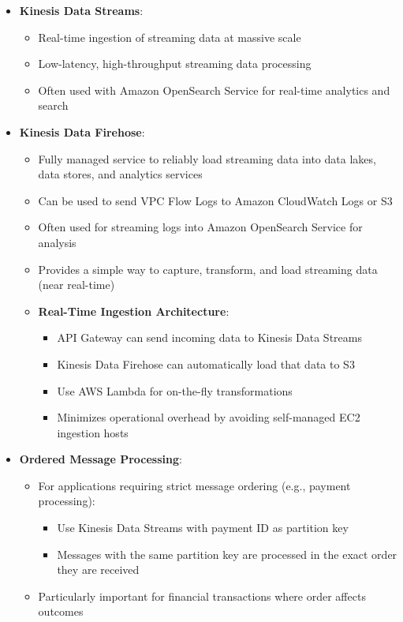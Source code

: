 \documentclass[11pt,a4paper]{report}
\begin{document}
\begin{itemize}
  \item \textbf{Kinesis Data Streams}:
\begin{itemize}
  \item Real-time ingestion of streaming data at massive scale
  \item Low-latency, high-throughput streaming data processing
  \item Often used with Amazon OpenSearch Service for real-time analytics and search
\end{itemize}
  \item \textbf{Kinesis Data Firehose}:
\begin{itemize}
  \item Fully managed service to reliably load streaming data into data lakes, data stores, and analytics services
  \item Can be used to send VPC Flow Logs to Amazon CloudWatch Logs or S3
  \item Often used for streaming logs into Amazon OpenSearch Service for analysis
  \item Provides a simple way to capture, transform, and load streaming data (near real-time)
  \item \textbf{Real-Time Ingestion Architecture}:
\begin{itemize}
  \item API Gateway can send incoming data to Kinesis Data Streams
  \item Kinesis Data Firehose can automatically load that data to S3
  \item Use AWS Lambda for on-the-fly transformations
  \item Minimizes operational overhead by avoiding self-managed EC2 ingestion hosts
\end{itemize}
\end{itemize}
  \item \textbf{Ordered Message Processing}:
\begin{itemize}
  \item For applications requiring strict message ordering (e.g., payment processing):
\begin{itemize}
  \item Use Kinesis Data Streams with payment ID as partition key
  \item Messages with the same partition key are processed in the exact order they are received
\end{itemize}
  \item Particularly important for financial transactions where order affects outcomes

\end{itemize}
\end{itemize}
\end{document}

